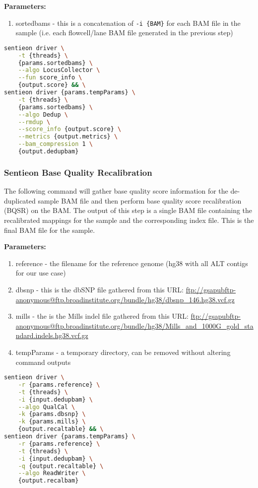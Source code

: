 \noindent\textbf{Parameters:}
\begin{enumerate}
    \item sortedbams - this is a concatenation of \texttt{-i \{BAM\}} for each BAM file in the sample (i.e. each flowcell/lane BAM file generated in the previous step)
\end{enumerate}

\begin{lstlisting}[language=bash]
sentieon driver \
    -t {threads} \
    {params.sortedbams} \
    --algo LocusCollector \
    --fun score_info \
    {output.score} && \
sentieon driver {params.tempParams} \
    -t {threads} \
    {params.sortedbams} \
    --algo Dedup \
    --rmdup \
    --score_info {output.score} \
    --metrics {output.metrics} \
    --bam_compression 1 \
    {output.dedupbam}
\end{lstlisting}

\subsubsection{Sentieon Base Quality Recalibration}
The following command will gather base quality score information for the de-duplicated sample BAM file and then perform base quality score recalibration (BQSR) on the BAM.  The output of this step is a single BAM file containing the recalibrated mappings for the sample and the corresponding index file.  This is the final BAM file for the sample.

\noindent\textbf{Parameters:}
\begin{enumerate}
    \item reference - the filename for the reference genome (hg38 with all ALT contigs for our use case)
    \item dbsnp - this is the dbSNP file gathered from this URL: \url{ftp://gsapubftp-anonymous@ftp.broadinstitute.org/bundle/hg38/dbsnp_146.hg38.vcf.gz}
    \item mills - the is the Mills indel file gathered from this URL: \url{ftp://gsapubftp-anonymous@ftp.broadinstitute.org/bundle/hg38/Mills_and_1000G_gold_standard.indels.hg38.vcf.gz}
    \item tempParams - a temporary directory, can be removed without altering command outputs
\end{enumerate}

\begin{lstlisting}[language=bash]
sentieon driver \
    -r {params.reference} \
    -t {threads} \
    -i {input.dedupbam} \
    --algo QualCal \
    -k {params.dbsnp} \
    -k {params.mills} \
    {output.recaltable} && \
sentieon driver {params.tempParams} \
    -r {params.reference} \
    -t {threads} \
    -i {input.dedupbam} \
    -q {output.recaltable} \
    --algo ReadWriter \
    {output.recalbam}
\end{lstlisting}

